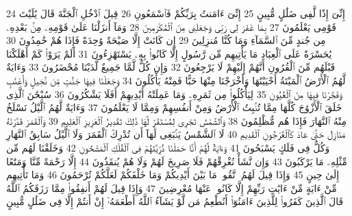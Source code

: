 {\tiny\colorbox{cl_aya}{24}} إِنِّىٓ إِذًا لَّفِى ضَلَٰلٍ مُّبِينٍ
{\tiny\colorbox{cl_aya}{25}} إِنِّىٓ ءَامَنتُ بِرَبِّكُمْ فَٱسْمَعُونِ
{\tiny\colorbox{cl_aya}{26}} قِيلَ ٱدْخُلِ ٱلْجَنَّةَ قَالَ يَٰلَيْتَ قَوْمِى يَعْلَمُونَ
{\tiny\colorbox{cl_aya}{27}} بِمَا غَفَرَ لِى رَبِّى وَجَعَلَنِى مِنَ ٱلْمُكْرَمِينَ
{\tiny\colorbox{cl_aya}{28}} وَمَآ أَنزَلْنَا عَلَىٰ قَوْمِهِۦ مِنۢ بَعْدِهِۦ مِن جُندٍ مِّنَ ٱلسَّمَآءِ وَمَا كُنَّا مُنزِلِينَ
{\tiny\colorbox{cl_aya}{29}} إِن كَانَتْ إِلَّا صَيْحَةً وَٰحِدَةً فَإِذَا هُمْ خَٰمِدُونَ
{\tiny\colorbox{cl_aya}{30}} يَٰحَسْرَةً عَلَى ٱلْعِبَادِ مَا يَأْتِيهِم مِّن رَّسُولٍ إِلَّا كَانُوا۟ بِهِۦ يَسْتَهْزِءُونَ
{\tiny\colorbox{cl_aya}{31}} أَلَمْ يَرَوْا۟ كَمْ أَهْلَكْنَا قَبْلَهُم مِّنَ ٱلْقُرُونِ أَنَّهُمْ إِلَيْهِمْ لَا يَرْجِعُونَ
{\tiny\colorbox{cl_aya}{32}} وَإِن كُلٌّ لَّمَّا جَمِيعٌ لَّدَيْنَا مُحْضَرُونَ
{\tiny\colorbox{cl_aya}{33}} وَءَايَةٌ لَّهُمُ ٱلْأَرْضُ ٱلْمَيْتَةُ أَحْيَيْنَٰهَا وَأَخْرَجْنَا مِنْهَا حَبًّا فَمِنْهُ يَأْكُلُونَ
{\tiny\colorbox{cl_aya}{34}} وَجَعَلْنَا فِيهَا جَنَّٰتٍ مِّن نَّخِيلٍ وَأَعْنَٰبٍ وَفَجَّرْنَا فِيهَا مِنَ ٱلْعُيُونِ
{\tiny\colorbox{cl_aya}{35}} لِيَأْكُلُوا۟ مِن ثَمَرِهِۦ وَمَا عَمِلَتْهُ أَيْدِيهِمْ أَفَلَا يَشْكُرُونَ
{\tiny\colorbox{cl_aya}{36}} سُبْحَٰنَ ٱلَّذِى خَلَقَ ٱلْأَزْوَٰجَ كُلَّهَا مِمَّا تُنۢبِتُ ٱلْأَرْضُ وَمِنْ أَنفُسِهِمْ وَمِمَّا لَا يَعْلَمُونَ
{\tiny\colorbox{cl_aya}{37}} وَءَايَةٌ لَّهُمُ ٱلَّيْلُ نَسْلَخُ مِنْهُ ٱلنَّهَارَ فَإِذَا هُم مُّظْلِمُونَ
{\tiny\colorbox{cl_aya}{38}} وَٱلشَّمْسُ تَجْرِى لِمُسْتَقَرٍّ لَّهَا ذَٰلِكَ تَقْدِيرُ ٱلْعَزِيزِ ٱلْعَلِيمِ
{\tiny\colorbox{cl_aya}{39}} وَٱلْقَمَرَ قَدَّرْنَٰهُ مَنَازِلَ حَتَّىٰ عَادَ كَٱلْعُرْجُونِ ٱلْقَدِيمِ
{\tiny\colorbox{cl_aya}{40}} لَا ٱلشَّمْسُ يَنۢبَغِى لَهَآ أَن تُدْرِكَ ٱلْقَمَرَ وَلَا ٱلَّيْلُ سَابِقُ ٱلنَّهَارِ وَكُلٌّ فِى فَلَكٍ يَسْبَحُونَ
{\tiny\colorbox{cl_aya}{41}} وَءَايَةٌ لَّهُمْ أَنَّا حَمَلْنَا ذُرِّيَّتَهُمْ فِى ٱلْفُلْكِ ٱلْمَشْحُونِ
{\tiny\colorbox{cl_aya}{42}} وَخَلَقْنَا لَهُم مِّن مِّثْلِهِۦ مَا يَرْكَبُونَ
{\tiny\colorbox{cl_aya}{43}} وَإِن نَّشَأْ نُغْرِقْهُمْ فَلَا صَرِيخَ لَهُمْ وَلَا هُمْ يُنقَذُونَ
{\tiny\colorbox{cl_aya}{44}} إِلَّا رَحْمَةً مِّنَّا وَمَتَٰعًا إِلَىٰ حِينٍ
{\tiny\colorbox{cl_aya}{45}} وَإِذَا قِيلَ لَهُمُ ٱتَّقُوا۟ مَا بَيْنَ أَيْدِيكُمْ وَمَا خَلْفَكُمْ لَعَلَّكُمْ تُرْحَمُونَ
{\tiny\colorbox{cl_aya}{46}} وَمَا تَأْتِيهِم مِّنْ ءَايَةٍ مِّنْ ءَايَٰتِ رَبِّهِمْ إِلَّا كَانُوا۟ عَنْهَا مُعْرِضِينَ
{\tiny\colorbox{cl_aya}{47}} وَإِذَا قِيلَ لَهُمْ أَنفِقُوا۟ مِمَّا رَزَقَكُمُ ٱللَّهُ قَالَ ٱلَّذِينَ كَفَرُوا۟ لِلَّذِينَ ءَامَنُوٓا۟ أَنُطْعِمُ مَن لَّوْ يَشَآءُ ٱللَّهُ أَطْعَمَهُۥٓ إِنْ أَنتُمْ إِلَّا فِى ضَلَٰلٍ مُّبِينٍ
